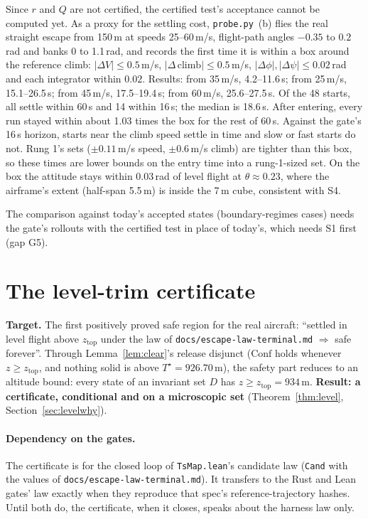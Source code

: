 \documentclass[11pt]{article}
\newcommand{\Conf}{\ensuremath{\mathrm{Conf}}}
\newcommand{\zTop}{z_{\mathrm{top}}}
\begin{document}
Since $r$ and $Q$ are not certified, the certified test's acceptance cannot be computed yet. As a proxy for the settling cost, \texttt{probe.py}~(b) flies the real straight escape from 150\,m at speeds 25--60\,m/s, flight-path angles $-0.35$ to $0.2$\,rad and banks 0 to 1.1\,rad, and records the first time it is within a box around the reference climb: $|\Delta V| \le 0.5$\,m/s, $|\Delta\,\text{climb}| \le 0.5$\,m/s, $|\Delta\phi|, |\Delta\psi| \le 0.02$\,rad and each integrator within $0.02$. Results: from 35\,m/s, 4.2--11.6\,s; from 25\,m/s, 15.1--26.5\,s; from 45\,m/s, 17.5--19.4\,s; from 60\,m/s, 25.6--27.5\,s. Of the 48 starts, all settle within 60\,s and 14 within 16\,s; the median is 18.6\,s. After entering, every run stayed within about 1.03 times the box for the rest of 60\,s. Against the gate's 16\,s horizon, starts near the climb speed settle in time and slow or fast starts do not. Rung 1's sets ($\pm 0.11$\,m/s speed, $\pm 0.6$\,m/s climb) are tighter than this box, so these times are lower bounds on the entry time into a rung-1-sized set. On the box the attitude stays within $0.03$\,rad of level flight at $\theta \approx 0.23$, where the airframe's extent (half-span 5.5\,m) is inside the 7\,m cube, consistent with S4.

The comparison against today's accepted states (boundary-regimes cases) needs the gate's rollouts with the certified test in place of today's, which needs S1 first (gap G5).

\section{The level-trim certificate}\label{sec:level}

\textbf{Target.} The first positively proved safe region for the real aircraft: ``settled in level flight above $\zTop$ under the law of \texttt{docs/escape-law-terminal.md} $\Rightarrow$ safe forever''. Through Lemma~\ref{lem:clear}'s release disjunct ($\Conf$ holds whenever $z \ge \zTop$, and nothing solid is above $T^\star = 926.70$\,m), the safety part reduces to an altitude bound: every state of an invariant set $D$ has $z \ge \zTop = 934$\,m. \textbf{Result: a certificate, conditional and on a microscopic set} (Theorem~\ref{thm:level}, Section~\ref{sec:levelwhy}).

\paragraph{Dependency on the gates.} The certificate is for the closed loop of \texttt{TsMap.lean}'s candidate law (\texttt{Cand} with the values of \texttt{docs/escape-law-terminal.md}). It transfers to the Rust and Lean gates' law exactly when they reproduce that spec's reference-trajectory hashes. Until both do, the certificate, when it closes, speaks about the harness law only.
\end{document}
